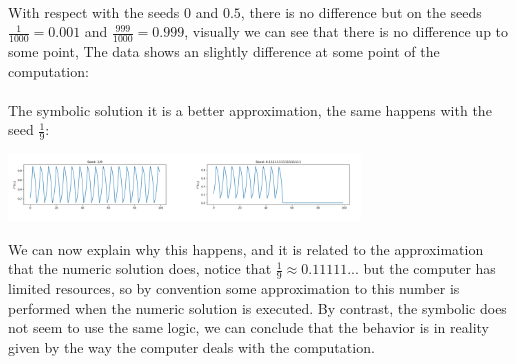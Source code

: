 \documentclass{article}
\begin{document}
\paragraph{}With respect with the seeds $0$ and $0.5$, there is no difference but on the seeds $\frac{1}{1000} = 0.001$ and $\frac{999}{1000} = 0.999$, visually we can see that there is no difference up to some point, The data shows an slightly difference at some point of the computation:
\begin{center}
\end{center}
\paragraph{}The symbolic solution it is a better approximation, the same happens with the seed $\frac{1}{9}$:
\begin{center}
	\includegraphics[width=0.7\textwidth]{9.png}
\end{center}
\begin{center}
\end{center}
We can now explain why this happens, and it is related to the approximation that the numeric solution does, notice that $\frac{1}{9} \approx 0.11111...$ but the computer has limited resources, so by convention some approximation to this number is performed when the numeric solution is executed. By contrast, the symbolic does not seem to use the same logic, we can conclude that the behavior is in reality given by the way the computer deals with the computation.
\end{document}
